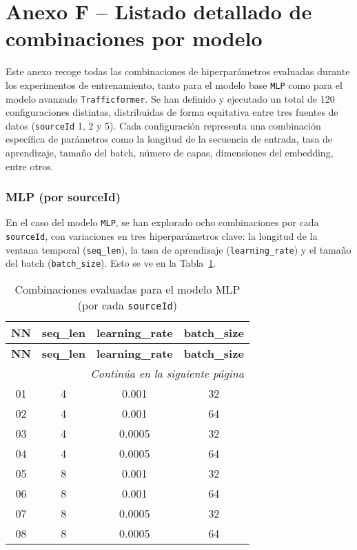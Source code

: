 \section*{Anexo F – Listado detallado de combinaciones por modelo}
\label{anexo:combinaciones_exp}

Este anexo recoge todas las combinaciones de hiperparámetros evaluadas durante los experimentos de entrenamiento, tanto para el modelo base \texttt{MLP} como para el modelo avanzado \texttt{Trafficformer}. Se han definido y ejecutado un total de 120 configuraciones distintas, distribuidas de forma equitativa entre tres fuentes de datos (\texttt{sourceId} 1, 2 y 5). Cada configuración representa una combinación específica de parámetros como la longitud de la secuencia de entrada, tasa de aprendizaje, tamaño del batch, número de capas, dimensiones del embedding, entre otros.

\subsubsection*{MLP (por sourceId)}

En el caso del modelo \texttt{MLP}, se han explorado ocho combinaciones por cada \texttt{sourceId}, con variaciones en tres hiperparámetros clave: la longitud de la ventana temporal (\texttt{seq\_len}), la tasa de aprendizaje (\texttt{learning\_rate}) y el tamaño del batch (\texttt{batch\_size}). Esto se ve en la Tabla~\ref{tab:mlp_combinaciones}.

\begin{longtable}{c c c c}
	\caption{Combinaciones evaluadas para el modelo MLP (por cada \texttt{sourceId})}
	\label{tab:mlp_combinaciones} \\
	\toprule
	\textbf{NN} & \textbf{seq\_len} & \textbf{learning\_rate} & \textbf{batch\_size} \\
	\midrule
	\endfirsthead
	
	\toprule
	\textbf{NN} & \textbf{seq\_len} & \textbf{learning\_rate} & \textbf{batch\_size} \\
	\midrule
	\endhead
	
	\midrule
	\multicolumn{4}{r}{\textit{Continúa en la siguiente página}} \\
	\midrule
	\endfoot
	
	\bottomrule
	\endlastfoot
	
	01 & 4 & 0.001  & 32 \\
	02 & 4 & 0.001  & 64 \\
	03 & 4 & 0.0005 & 32 \\
	04 & 4 & 0.0005 & 64 \\
	05 & 8 & 0.001  & 32 \\
	06 & 8 & 0.001  & 64 \\
	07 & 8 & 0.0005 & 32 \\
	08 & 8 & 0.0005 & 64 \\
	
\end{longtable}

